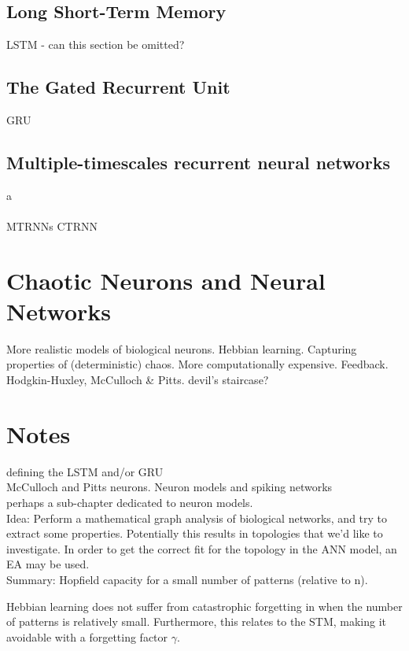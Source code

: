 \subsection{Long Short-Term Memory}\label{LSTM}

LSTM - can this section be omitted?


\subsection{The Gated Recurrent Unit}\label{GRU}

GRU

\subsection{Multiple-timescales recurrent neural networks}

a
\\\\
MTRNNs
CTRNN
\cite{Tani2014}


\section{Chaotic Neurons and Neural Networks}

More realistic models of biological neurons. Hebbian learning. Capturing properties of (deterministic) chaos. More computationally expensive. Feedback. Hodgkin-Huxley, McCulloch \& Pitts. devil's staircase?
\cite{McCulloch1943}


\section{Notes}
defining the LSTM and/or GRU
\\
McCulloch and Pitts neurons. Neuron models and spiking networks
\\
perhaps a sub-chapter dedicated to neuron models.
\\
Idea: Perform a mathematical graph analysis of biological networks, and try to extract some properties. Potentially this results in topologies that we'd like to investigate. In order to get the correct fit for the topology in the ANN model, an EA may be used.
\\
Summary: Hopfield capacity for a small number of patterns (relative to n).

Hebbian learning does not suffer from catastrophic forgetting in \cite{Hattori2014} when the number of patterns is relatively small. Furthermore, this relates to the STM, making it avoidable with a forgetting factor $\gamma$.


\cleardoublepage